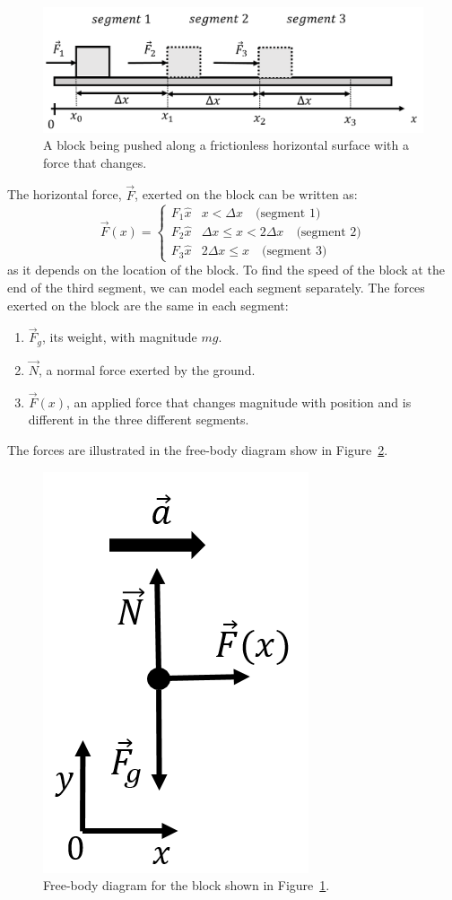 \begin{figure}[!htbp]
\centering
\includegraphics[width=0.7\linewidth]{files/blockvaryingforce-fcc0ef639c44cd3ed5e47cd858ad5a33.png}
\caption[]{A block being pushed along a frictionless horizontal surface with a force that changes.}
\label{fig:applyingnewtonslaws:blockvaryingforce}
\end{figure}

The horizontal force, $\vec F$, exerted on the block can be written as:
\begin{equation}
  \vec F (x)=
  \begin{cases}
    F_1\hat x & x<\Delta x \quad \text{(segment 1)}\\
    F_2\hat x & \Delta x \leq x< 2\Delta x \quad \text{(segment 2)}\\
    F_3\hat x & 2\Delta x \leq x\quad \text{(segment 3)}
  \end{cases}
\end{equation}
as it depends on the location of the block. To find the speed of the block at the end of the third segment, we can model each segment separately. The forces exerted on the block are the same in each segment:

\begin{enumerate}
\item $\vec F_g$, its weight, with magnitude $mg$.
\item $\vec N$, a normal force exerted by the ground.
\item $\vec F(x)$, an applied force that changes magnitude with position and is different in the three different segments.
\end{enumerate}

The forces are illustrated in the free-body diagram show in Figure~\ref{fig:applyingnewtonslaws:blockvaryingforce_fbd}.

\begin{figure}[!htbp]
\centering
\includegraphics[width=0.2\linewidth]{files/blockvaryingforce_fb-f8568f60b83e0828429fe2eaf2c81104.png}
\caption[]{Free-body diagram for the block shown in Figure~\ref{fig:applyingnewtonslaws:blockvaryingforce}.}
\label{fig:applyingnewtonslaws:blockvaryingforce_fbd}
\end{figure}

